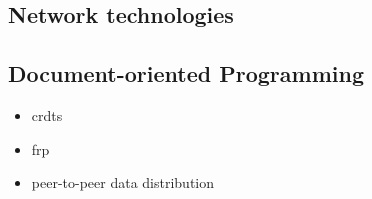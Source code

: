 \documentclass[sigplan,10pt]{acmart}
\begin{document}

\subsection{Network technologies}




\subsection{Document-oriented Programming}
\begin{itemize}
    \item crdts
    \item frp
    \item peer-to-peer data distribution
\end{itemize}
\end{document}
